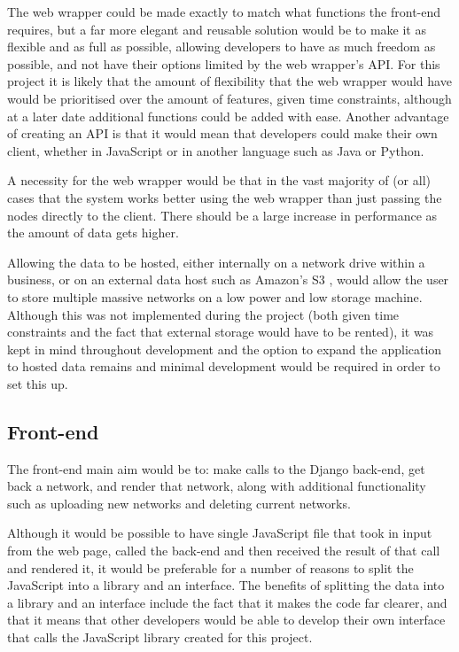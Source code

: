 \documentclass[../dissertation.tex]{subfiles}
\begin{document}
The web wrapper could be made exactly to match what functions the front-end requires, but a far more elegant and reusable solution would be to make it as flexible and as full as possible, allowing developers to have as much freedom as possible, and not have their options limited by the web wrapper's API. For this project it is likely that the amount of flexibility that the web wrapper would have would be prioritised over the amount of features, given time constraints, although at a later date additional functions could be added with ease. Another advantage of creating an API is that it would mean that developers could make their own client, whether in JavaScript or in another language such as Java or Python.

A necessity for the web wrapper would be that in the vast majority of (or all) cases that the system works better using the web wrapper than just passing the nodes directly to the client. There should be a large increase in performance as the amount of data gets higher.

Allowing the data to be hosted, either internally on a network drive within a business, or on an external data host such as Amazon's S3 \cite{amazons3}, would allow the user to store multiple massive networks on a low power and low storage machine. Although this was not implemented during the project (both given time constraints and the fact that external storage would have to be rented), it was kept in mind throughout development and the option to expand the application to hosted data remains and minimal development would be required in order to set this up.

\subsection{Front-end}

The front-end main aim would be to: make calls to the Django back-end, get back a network, and render that network, along with additional functionality such as uploading new networks and deleting current networks. 

Although it would be possible to have single JavaScript file that took in input from the web page, called the back-end and then received the result of that call and rendered it, it would be preferable for a number of reasons to split the JavaScript into a library and an interface. The benefits of splitting the data into a library and an interface include the fact that it makes the code far clearer, and that it means that other developers would be able to develop their own interface that calls the JavaScript library created for this project.
\end{document}
